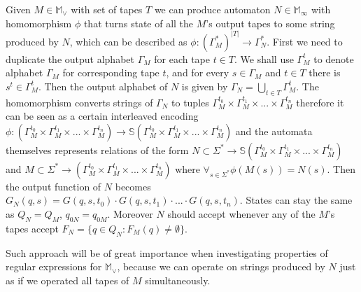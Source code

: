 \documentclass[12pt]{article}
\begin{document}
Given $M \in \mathbb{ M}_\vee$ with set of tapes $T$ we can produce automaton $N \in \mathbb{ M}_\infty$ with homomorphism $\phi$ that turns state of all the $M$'s output tapes to some string produced by $N$, which can be described as  $\phi : (\Gamma_M^*)^{\vert T \vert} \rightarrow \Gamma_N^*$. First we need to duplicate the output alphabet $\Gamma_M$ for each tape $t\in T$. We shall use $\Gamma^t_M$ to denote alphabet $\Gamma_M$ for corresponding tape $t$, and for every $s \in \Gamma_M$ and $t\in T$ there is $s^t \in \Gamma^t_M$. Then the output alphabet of $N$ is given by $\Gamma_N = \bigcup_{t\in T}\Gamma_M^t$. The homomorphism converts strings of $\Gamma_N$ to tuples $\Gamma_M^{t_0} \times \Gamma_M^{t_1} \times ... \times  \Gamma_M^{t_n} $ therefore it can be seen as a certain interleaved encoding $\phi : (\Gamma_M^{t_0} \times \Gamma_M^{t_1} \times ... \times  \Gamma_M^{t_n}) \rightarrow \mathbb{ S}(\Gamma_M^{t_0} \times \Gamma_M^{t_1} \times ... \times  \Gamma_M^{t_n})$ and the automata themselves represents relations of the form $N \subset  \Sigma^* \rightarrow \mathbb{S}(\Gamma_M^{t_0} \times \Gamma_M^{t_1} \times ... \times  \Gamma_M^{t_n})$ and $M \subset \Sigma^* \rightarrow (\Gamma_M^{t_0} \times \Gamma_M^{t_1} \times ... \times  \Gamma_M^{t_n})$ where $\forall_{s\in\Sigma^*} \phi(M(s))=N(s)$. Then the output function of $N$ becomes $G_N(q,s) = G(q,s,t_0) \cdot G(q,s,t_1) \cdot ... \cdot G(q,s,t_n)$. States can stay the same as $Q_N = Q_M$, $q_{0N} = q_{0M}$. Moreover $N$ should accept whenever any of the $M$'s tapes accept $F_N = \{ q \in Q_ N: F_M(q) \ne \emptyset \}$.  

Such approach will be of great importance when investigating properties of regular expressions for $\mathbb{ M}_\vee$, because we can operate on strings produced by $N$ just as if we operated all tapes of $M$ simultaneously.
\end{document}

